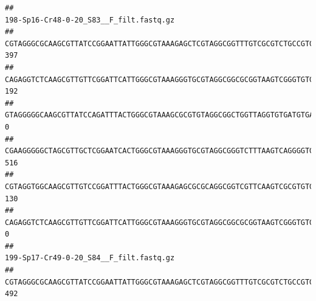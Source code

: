 \documentclass[]{article}
\begin{document}
\begin{verbatim}
##                                                                                                                                                                                                                                                           198-Sp16-Cr48-0-20_S83__F_filt.fastq.gz
## CGTAGGGCGCAAGCGTTATCCGGAATTATTGGGCGTAAAGAGCTCGTAGGCGGTTTGTCGCGTCTGCCGTGAAAGTCCGGGGCTCAACTCCGGATCTGCGGTGGGTACGGGCAGACTAGAGTGATGTAGGGGAGACTGGAATTCCTGGTGTAGCGGTGAAATGCGCAGATATCAGGAGGAACACCGATGGCGAAGGCAGGTCTCTGGGCATTAACTGACGCTGAGGAGCGAAAGCATGGGGAGCGAACA                                     397
## CAGAGGTCTCAAGCGTTGTTCGGATTCATTGGGCGTAAAGGGTGCGTAGGCGGCGCGGTAAGTCGGGTGTGAAATCTCGGAGCTTAACTCCGAAACTGCATTCGATACTGCCGTGCTTGAGGACTGGAGAGGAGACTGGAATTTACGGTGTAGCGGTGAAATGCGTAGATATCGTAAGGAAGACCAGTGGCGAAGGCGGGTCTCTGGACAGTTCCTGACGCTGAGGCACGAAGGCCAGGGGAGCAAACG                                     192
## GTAGGGGGCAAGCGTTATCCAGATTTACTGGGCGTAAAGCGCGTGTAGGCGGCTGGTTAGGTGTGATGTGAAATCTTCCGGCTCAACCGGAAAACTGCATTGCAAACCGGCCTGGCTAGAGTGCAGGAGAGGGAAGCGGAATTCCAGGTGTAGCGGTGAAATGCGTAGATATCTGGAGGAACACCAGTGGCGAAGGCGGCTTCCTGGCCTGCAACTGACGCTGAGACGCGAAAGCGTGGGGAGCGAAC                                        0
## CGAAGGGGGCTAGCGTTGCTCGGAATCACTGGGCGTAAAGGGTGCGTAGGCGGGTCTTTAAGTCAGGGGTGAAATCCTGGAGCTCAACTCCAGAACTGCCTTTGATACTGAAGATCTTGAGTTCGGGAGAGGTGAGTGGAACTGCGAGTGTAGAGGTGAAATTCGTAGATATTCGCAAGAACACCAGTGGCGAAGGCGGCTCACTGGCCCGATACTGACGCTGAGGCACGAAAGCGTGGGGAGCAAACA                                     516
## CGTAGGTGGCAAGCGTTGTCCGGATTTACTGGGCGTAAAGAGCGCGCAGGCGGTCGTTCAAGTCGCGTGTGAAAGCCCCCGGCTCAACTGGGGAGGGTCACGCGATACTGATCGACTCGAAGGCAGGAGAGGGTAGTGGAATTCCCGGTGTAGTGGTGAAATGCGTAGATATCGGGAGGAACACCAGTGGCGAAGGCGACTACCTGGCCTGTTCTTGACGCTGAGGCGCGAAAGCTAGGGGAGCAAACG                                     130
## CAGAGGTCTCAAGCGTTGTTCGGATTCATTGGGCGTAAAGGGTGCGTAGGCGGCGCGGTAAGTCGGGTGTGAAATCTCGGGGCTTAACTCCGAAACTGCATTCGATACTGCCGTGCTTGAGGACTGGAGAGGAGACTGGAATTTACGGTGTAGCGGTGAAATGCGTAGATATCGTAAGGAAGACCAGTGGCGAAGGCGGGTCTCTGGACAGTTCCTGACGCTGAGGCACGAAGGCCAGGGGAGCAAACG                                       0
##                                                                                                                                                                                                                                                           199-Sp17-Cr49-0-20_S84__F_filt.fastq.gz
## CGTAGGGCGCAAGCGTTATCCGGAATTATTGGGCGTAAAGAGCTCGTAGGCGGTTTGTCGCGTCTGCCGTGAAAGTCCGGGGCTCAACTCCGGATCTGCGGTGGGTACGGGCAGACTAGAGTGATGTAGGGGAGACTGGAATTCCTGGTGTAGCGGTGAAATGCGCAGATATCAGGAGGAACACCGATGGCGAAGGCAGGTCTCTGGGCATTAACTGACGCTGAGGAGCGAAAGCATGGGGAGCGAACA                                     492

\end{verbatim}
\end{document}
